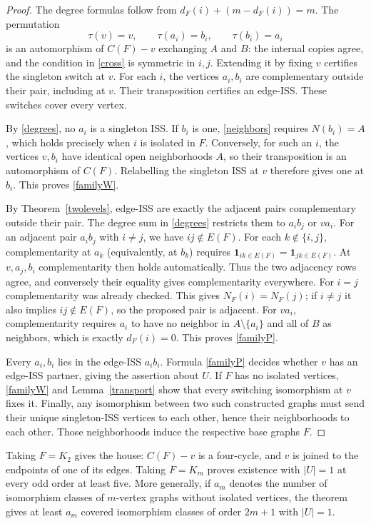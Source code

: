 \documentclass[11pt]{article}
\begin{document}
\begin{proof}
The degree formulas follow from
$d_F(i)+(m-d_F(i))=m$. The permutation
\[
 \tau(v)=v,\qquad \tau(a_i)=b_i,\qquad \tau(b_i)=a_i
\]
is an automorphism of $C(F)-v$ exchanging $A$ and $B$: the internal
copies agree, and the condition in \eqref{cross} is symmetric in $i,j$.
Extending it by fixing $v$ certifies the singleton switch at $v$.
For each $i$, the vertices $a_i,b_i$ are complementary outside their
pair, including at $v$. Their transposition certifies an edge-ISS.
These switches cover every vertex.

By \eqref{degrees}, no $a_i$ is a singleton ISS. If $b_i$ is one,
\eqref{neighbors} requires $N(b_i)=A$, which holds precisely when $i$
is isolated in $F$. Conversely, for such an $i$, the vertices $v,b_i$
have identical open neighborhoods $A$, so their transposition is an
automorphism of $C(F)$. Relabelling the singleton ISS at $v$ therefore
gives one at $b_i$. This proves \eqref{familyW}.

By Theorem~\ref{twolevels}, edge-ISS are exactly the adjacent pairs
complementary outside their pair. The degree sum in \eqref{degrees}
restricts them to $a_i b_j$ or $v a_i$. For an adjacent pair $a_i b_j$ with $i\ne j$, we have
$ij\notin E(F)$. For each $k\notin\{i,j\}$, complementarity at
$a_k$ (equivalently, at $b_k$) requires
$\mathbf{1}_{ik\in E(F)}=\mathbf{1}_{jk\in E(F)}$. At $v,a_j,b_i$
complementarity then holds automatically. Thus the two adjacency rows
agree, and conversely their equality gives complementarity everywhere.
For $i=j$ complementarity was already checked. This gives
$N_F(i)=N_F(j)$; if $i\ne j$
it also implies $ij\notin E(F)$, so the proposed pair is adjacent.
For $v a_i$, complementarity requires $a_i$ to have no neighbor in
$A\setminus\{a_i\}$ and all of $B$ as neighbors, which is exactly
$d_F(i)=0$. This proves \eqref{familyP}.

Every $a_i,b_i$ lies in the edge-ISS $a_i b_i$. Formula
\eqref{familyP} decides whether $v$ has an edge-ISS partner, giving
the assertion about $U$. If $F$ has no isolated vertices,
\eqref{familyW} and Lemma~\ref{transport} show that every switching
isomorphism at $v$ fixes it. Finally, any isomorphism between two such
constructed graphs must send their unique singleton-ISS vertices to
each other, hence their neighborhoods to each other. Those
neighborhoods induce the respective base graphs $F$.
\end{proof}

Taking $F=K_2$ gives the house: $C(F)-v$ is a four-cycle, and $v$ is
joined to the endpoints of one of its edges. Taking $F=K_m$ proves
existence with $|U|=1$ at every odd order at least five. More generally,
if $a_m$ denotes the number of isomorphism classes of $m$-vertex graphs
without isolated vertices, the theorem gives at least $a_m$ covered
isomorphism classes of order $2m+1$ with $|U|=1$.
\end{document}
